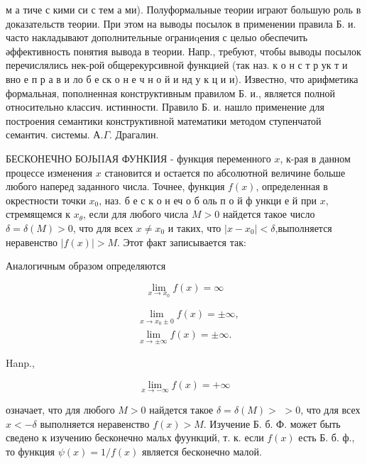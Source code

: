 \documentclass[10pt]{article}
\begin{document}
м а тиче с кими си с тем а ми). Полуформальные теории играют большую роль в доказательств теории. При этом на выводы посылок в применении правила Б. и. часто накладывают дополнительные ограниqения с целыо обеспечить әффективность понятия вывода в теории. Напр., требуют, чтобы выводы посылок перечислялись нек-рой общерекурсивной функцией (так наз. к о н с т р ук т и вно е п р а в и ло б е ск о н е ч н о й и нд у к ц и и). Известно, что арифметика формальная, пополненная конструктивным правилом Б. и., является полной относительно классич. истинности. Правило Б. и. нашло применение для построения семантики конструктивной математики методом ступенчатой семантич. системы. $А . \Gamma$. Драгалин.



БЕСКОНЕЧНО БОЈЬIIАЯ ФУНКІИЯ - функция переменного $x$, к-рая в данном процессе изменения $x$ становится и остается по абсолютной величине больше любого наперед заданного числа. Точнее, функция $f(x)$, определенная в окрестности точки $x_{0}$, наз. б е с к о н еч о б оль п о й ф ункци е й при $x$, стремящемся к $x_{\theta}$, если для любого числа $M>0$ найдется такое число $\delta=\delta(M)>0$, что для всех $x \neq x_{0}$ и таких, что $\left|x-x_{0}\right|<\delta$,выполняется неравенство $|f(x)|>M$. Этот факт записывается так:



Аналогичным образом определяются



\[

\lim _{x \rightarrow x_{0}} f(x)=\infty

\]



\[

\begin{aligned}

& \lim _{x \rightarrow x_{0} \pm 0} f(x)= \pm \infty, \\

& \lim _{x \rightarrow \pm \infty} f(x)= \pm \infty .

\end{aligned}

\]



Hanp.,



\[

\lim _{x \rightarrow-\infty} f(x)=+\infty

\]



означает, что для любого $M>0$ найдется такое $\delta=\delta(M)>$ $>0$, что для всех $x<-\delta$ выполняется неравенство $f(x)>M$. Изучение Б. б. Ф. может быть сведено к изучению бесконечно мальх фуункций, т. к. если $f(x)$ есть Б. б. ф., то функция $\psi(x)=1 / f(x)$ является бесконечно малой.
\end{document}

